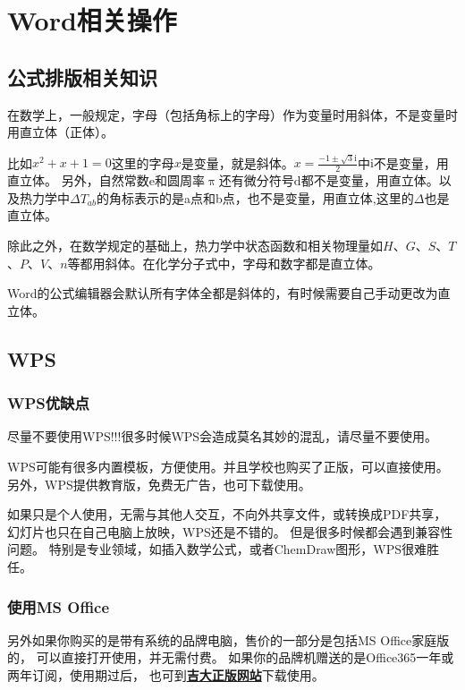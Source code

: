 \newpage
\section{Word相关操作}
\subsection{公式排版相关知识}
在数学上，一般规定，字母（包括角标上的字母）作为变量时用斜体，不是变量时用直立体（正体）。

比如$x^2+x+1=0$这里的字母$x$是变量，就是斜体。$x=\frac{-1\pm{}\sqrt{3}\mathrm{i}}{2}$中$\mathrm{i}$不是变量，用直立体。
另外，自然常数$\mathrm{e}$和圆周率$\uppi$还有微分符号$\mathrm{d}$都不是变量，用直立体。以及热力学中$\Delta{}T_{ab}$的角标表示的是a点和b点，也不是变量，用直立体,这里的$\Delta$也是直立体。

除此之外，在数学规定的基础上，热力学中状态函数和相关物理量如$H$、$G$、$S$、$T$、$P$、$V$、$n$等都用斜体。在化学分子式中，字母和数字都是直立体。

Word的公式编辑器会默认所有字体全都是斜体的，有时候需要自己手动更改为直立体。

\subsection{WPS}
\subsubsection{WPS优缺点}
尽量不要使用WPS!!!很多时候WPS会造成莫名其妙的混乱，请尽量不要使用。

WPS可能有很多内置模板，方便使用。并且学校也购买了正版，可以直接使用。
另外，WPS提供教育版，免费无广告，也可下载使用。

如果只是个人使用，无需与其他人交互，不向外共享文件，或转换成PDF共享，
幻灯片也只在自己电脑上放映，WPS还是不错的。
但是很多时候都会遇到兼容性问题。
特别是专业领域，如插入数学公式，或者ChemDraw图形，WPS很难胜任。

\subsubsection{使用MS Office} 

另外如果你购买的是带有系统的品牌电脑，售价的一部分是包括MS Office家庭版的，
可以直接打开使用，并无需付费。
如果你的品牌机赠送的是Office365一年或两年订阅，使用期过后，
也可到\textbf{\textcolor{blue}{\href{https://zbhrj1.jlu.edu.cn/download/office2021.html}{吉大正版网站}}}下载使用。

